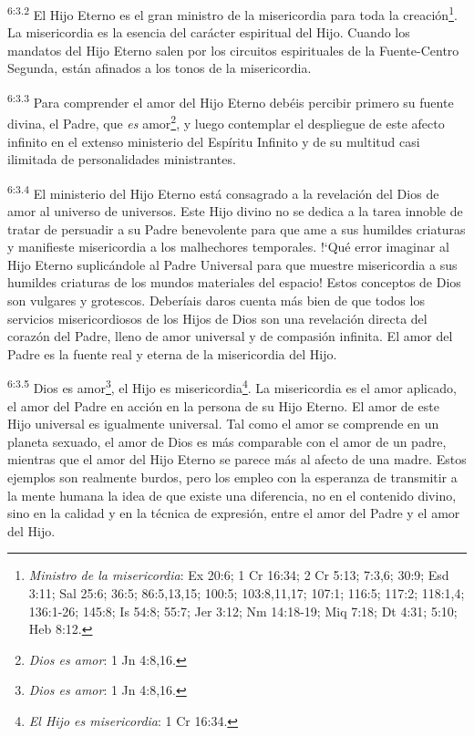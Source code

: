 \par
\textsuperscript{6:3.2} El Hijo Eterno es el gran ministro de la misericordia para toda la creación\footnote{\textit{Ministro de la misericordia}: Ex 20:6; 1 Cr 16:34; 2 Cr 5:13; 7:3,6; 30:9; Esd 3:11; Sal 25:6; 36:5; 86:5,13,15; 100:5; 103:8,11,17; 107:1; 116:5; 117:2; 118:1,4; 136:1-26; 145:8; Is 54:8; 55:7; Jer 3:12; Nm 14:18-19; Miq 7:18; Dt 4:31; 5:10; Heb 8:12.}. La misericordia es la esencia del carácter espiritual del Hijo. Cuando los mandatos del Hijo Eterno salen por los circuitos espirituales de la Fuente-Centro Segunda, están afinados a los tonos de la misericordia.

\par
\textsuperscript{6:3.3} Para comprender el amor del Hijo Eterno debéis percibir primero su fuente divina, el Padre, que \textit{es} amor\footnote{\textit{Dios es amor}: 1 Jn 4:8,16.}, y luego contemplar el despliegue de este afecto infinito en el extenso ministerio del Espíritu Infinito y de su multitud casi ilimitada de personalidades ministrantes.

\par
\textsuperscript{6:3.4} El ministerio del Hijo Eterno está consagrado a la revelación del Dios de amor al universo de universos. Este Hijo divino no se dedica a la tarea innoble de tratar de persuadir a su Padre benevolente para que ame a sus humildes criaturas y manifieste misericordia a los malhechores temporales. !`Qué error imaginar al Hijo Eterno suplicándole al Padre Universal para que muestre misericordia a sus humildes criaturas de los mundos materiales del espacio! Estos conceptos de Dios son vulgares y grotescos. Deberíais daros cuenta más bien de que todos los servicios misericordiosos de los Hijos de Dios son una revelación directa del corazón del Padre, lleno de amor universal y de compasión infinita. El amor del Padre es la fuente real y eterna de la misericordia del Hijo.

\par
\textsuperscript{6:3.5} Dios es amor\footnote{\textit{Dios es amor}: 1 Jn 4:8,16.}, el Hijo es misericordia\footnote{\textit{El Hijo es misericordia}: 1 Cr 16:34.}. La misericordia es el amor aplicado, el amor del Padre en acción en la persona de su Hijo Eterno. El amor de este Hijo universal es igualmente universal. Tal como el amor se comprende en un planeta sexuado, el amor de Dios es más comparable con el amor de un padre, mientras que el amor del Hijo Eterno se parece más al afecto de una madre. Estos ejemplos son realmente burdos, pero los empleo con la esperanza de transmitir a la mente humana la idea de que existe una diferencia, no en el contenido divino, sino en la calidad y en la técnica de expresión, entre el amor del Padre y el amor del Hijo.

